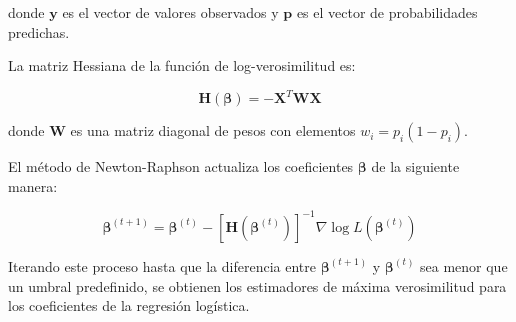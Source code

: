donde $\mathbf{y}$ es el vector de valores observados y $\mathbf{p}$ es el vector de probabilidades predichas.

La matriz Hessiana de la función de log-verosimilitud es:

\begin{equation}
\mathbf{H}(\boldsymbol{\beta}) = -\mathbf{X}^T \mathbf{W} \mathbf{X}
\end{equation}

donde $\mathbf{W}$ es una matriz diagonal de pesos con elementos $w_i = p_i (1 - p_i)$.

El método de Newton-Raphson actualiza los coeficientes $\boldsymbol{\beta}$ de la siguiente manera:

\begin{equation}
\boldsymbol{\beta}^{(t+1)} = \boldsymbol{\beta}^{(t)} - [\mathbf{H}(\boldsymbol{\beta}^{(t)})]^{-1} \nabla \log L(\boldsymbol{\beta}^{(t)})
\end{equation}

Iterando este proceso hasta que la diferencia entre $\boldsymbol{\beta}^{(t+1)}$ y $\boldsymbol{\beta}^{(t)}$ sea menor que un umbral predefinido, se obtienen los estimadores de máxima verosimilitud para los coeficientes de la regresión logística.

